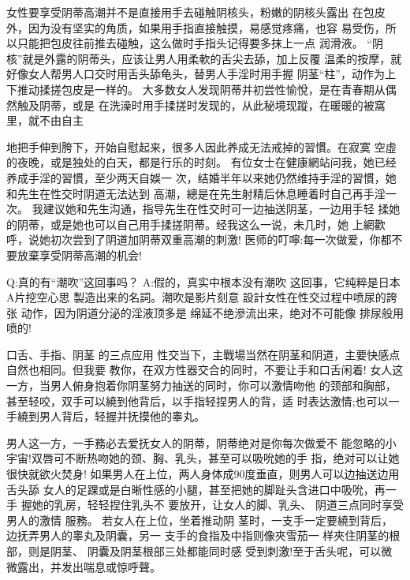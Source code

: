 \documentclass[12pt,UTF8]{ctexbook}
\begin{document}
女性要享受阴蒂高潮并不是直接用手去碰触阴核头，粉嫩的阴核头露出
在包皮外，因为没有坚实的角质，如果用手指直接触摸，易感觉疼痛，也容
易受伤，所以只能把包皮往前推去碰触，这么做时手指头记得要多抹上一点
润滑液。
“阴核”就是外露的阴蒂头，应该让男人用柔軟的舌尖去舔，加上反覆
温柔的按摩，就好像女人帮男人口交时用舌头舔龟头，替男人手淫时用手握
阴茎“柱”，动作为上下推动揉搓包皮是一样的。
大多数女人发现阴蒂并初尝性愉悅，是在青春期从偶然触及阴蒂，或是
在洗澡时用手揉搓时发现的，从此秘境现蹤，在暖暖的被窩里，就不由自主

地把手伸到胯下，开始自慰起来，很多人因此养成无法戒掉的習慣。在寂寞
空虛的夜晚，或是独处的白天，都是行乐的时刻。
有位女士在健康網站问我，她已经养成手淫的習慣，至少两天自娛一
次，结婚半年以来她仍然维持手淫的習慣，她和先生在性交时阴道无法达到
高潮，總是在先生射精后休息睡着时自己再手淫一次。
我建议她和先生沟通，指导先生在性交时可一边抽送阴茎，一边用手轻
揉她的阴蒂，或是她也可以自己用手揉搓阴蒂。经我这么一说，未几时，她
上網歡呼，说她初次尝到了阴道加阴蒂双重高潮的刺激!
医师的叮嚀:每一次做爱，你都不要放棄享受阴蒂高潮的机会!

Q:真的有“潮吹”这回事吗？
A:假的，真实中根本没有潮吹
这回事，它纯粹是日本A片挖空心思
製造出来的名詞。潮吹是影片刻意
設計女性在性交过程中喷尿的誇张
动作，因为阴道分泌的淫液顶多是
绵延不绝滲流出来，绝对不可能像
排尿般用喷的!

口舌、手指、阴茎
的三点应用
性交当下，主戰場当然在阴茎和阴道，主要快感点自然也相同。但我要
教你，在双方性器交合的同时，不要让手和口舌闲着!
女人这一方，当男人俯身抱着你阴茎努力抽送的同时，你可以激情吻他
的颈部和胸部，甚至轻咬，双手可以繞到他背后，以手指轻捏男人的背，适
时表达激情;也可以一手繞到男人背后，轻握并抚摸他的睾丸。

男人这一方，一手務必去爱抚女人的阴蒂，阴蒂绝对是你每次做爱不
能忽略的小宇宙!双唇可不断热吻她的颈、胸、乳头，甚至可以吸吮她的手
指，绝对可以让她很快就欲火焚身!
如果男人在上位，两人身体成90度垂直，则男人可以边抽送边用舌头舔
女人的足踝或是白晰性感的小腿，甚至把她的脚趾头含进口中吸吮，再一手
握她的乳房，轻轻捏住乳头不
要放开，让女人的脚、乳头、
阴道三点同时享受男人的激情
服務。
若女人在上位，坐着推动阴
茎时，一支手一定要繞到背后，
边抚弄男人的睾丸及阴囊，另一
支手的食指及中指则像夾雪茄一
样夾住阴茎的根部，则是阴茎、
阴囊及阴茎根部三处都能同时感
受到刺激!至于舌头呢，可以微
微露出，并发出喘息或惊呼聲。
\end{document}
